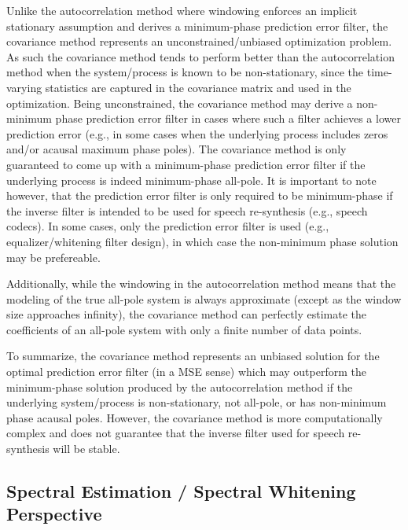 Unlike the autocorrelation method where windowing enforces an implicit stationary assumption and derives a minimum-phase prediction error filter, the covariance method represents an unconstrained/unbiased optimization problem. As such the covariance method tends to perform better than the autocorrelation method when the system/process is known to be non-stationary, since the time-varying statistics are captured in the covariance matrix and used in the optimization. Being unconstrained, the covariance method may derive a non-minimum phase prediction error filter in cases where such a filter achieves a lower prediction error (e.g., in some cases when the underlying process includes zeros and/or acausal maximum phase poles). The covariance method is only guaranteed to come up with a minimum-phase prediction error filter if the underlying process is indeed minimum-phase all-pole. It is important to note however, that the prediction error filter is only required to be minimum-phase if the inverse filter is intended to be used for speech re-synthesis (e.g., speech codecs). In some cases, only the prediction error filter is used (e.g., equalizer/whitening filter design), in which case the non-minimum phase solution may be prefereable.

Additionally, while the windowing in the autocorrelation method means that the modeling of the true all-pole system is always approximate (except as the window size approaches infinity), the covariance method can perfectly estimate the coefficients of an all-pole system with only a finite number of data points.

To summarize, the covariance method represents an unbiased solution for the optimal prediction error filter (in a MSE sense) which may outperform the minimum-phase solution produced by the autocorrelation method if the underlying system/process is non-stationary, not all-pole, or has non-minimum phase acausal poles. However, the covariance method is more computationally complex and does not guarantee that the inverse filter used for speech re-synthesis will be stable.

\subsection{Spectral Estimation / Spectral Whitening Perspective}

